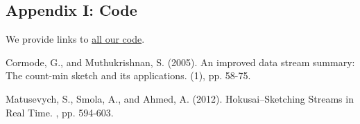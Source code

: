 \documentclass[twoside]{article}
\begin{document}
\begin{multicols}{2}
\section{Appendix I: Code} \label{sec:Appendix_code}

We provide links to \href{https://github.com/kiranvodrahalli/cos521/}{all our code}.

\end{multicols}


\begin{thebibliography}{99} %

Cormode, G., and Muthukrishnan, S. (2005). 
\newblock An improved data stream summary: The count-min sketch and its applications. 
(1), pp. 58-75.

Matusevych, S., Smola, A., and Ahmed, A. (2012).
\newblock Hokusai--Sketching Streams in Real Time.
, pp. 594-603.


 
\end{thebibliography}

\end{document}
